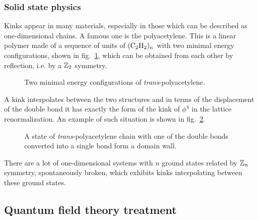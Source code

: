 \documentclass[../main/main.tex]{subfiles}
\begin{document}
\subsubsection{Solid state physics}

Kinks appear in many materials, especially in those which can be described as one-dimensional chains. A famous one is the polyacetylene. This is a linear polymer made of a sequence of units of $(\text C_2\text H_2)_n$ with two minimal energy configurations, shown in fig.~\ref{fig:polyacetylene}, which can be obtained from each other by reflection, i.e. by a $\mathbb{Z}_2$ symmetry.

\begin{figure}[h]
	\centering
	\quad
	\caption{Two minimal energy configurations of \emph{trans}-polyacetylene.}
	\label{fig:polyacetylene}
\end{figure}

A kink interpolates between the two structures and in terms of the displacement of the double bond it has exactly the form of the kink of $\phi^4$ in the lattice renormalization. An example of such situation is shown in fig.~\ref{fig:kink-polyacetylene}.

\begin{figure}[h]
	\centering
	\caption{A state of \emph{trans}-polyacetylene chain with one of the double bonds\\converted into a single bond form a domain wall.}
	\label{fig:kink-polyacetylene}
\end{figure}

There are a lot of one-dimensional systems with $n$ ground states related by $\mathbb{Z}_n$ symmetry, spontaneously broken, which exhibits kinks interpolating between these ground states. 

\subsection{Quantum field theory treatment}
\end{document}
